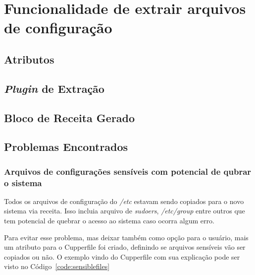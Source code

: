 \section{Funcionalidade de extrair arquivos de configuração}
\label{sec:files}
\subsection{Atributos}
\subsection{\textit{Plugin} de Extração}
\subsection{Bloco de Receita Gerado}
\subsection{Problemas Encontrados}

\subsubsection{Arquivos de configurações sensíveis com potencial de qubrar o sistema}
Todos os arquivos de configuração do \textit{/etc} estavam sendo copiados para
o novo sistema via receita. Isso incluia arquivo de \textit{sudoers}, \textit{/etc/group}
entre outros que tem potencial de quebrar o acesso ao sistema caso ocorra algum erro.

Para evitar esse problema, mas deixar também como opção para o usuário, mais um
atributo para o Cupperfile foi criado, definindo se arquivos sensíveis vão ser
copiados ou não. O exemplo vindo do Cupperfile com sua explicação pode ser visto no
Código~\ref{code:sensiblefiles}

\noindent\begin{minipage}{0.7\textwidth}
  \lstset{style=shell}
  
\end{minipage}\hfill
